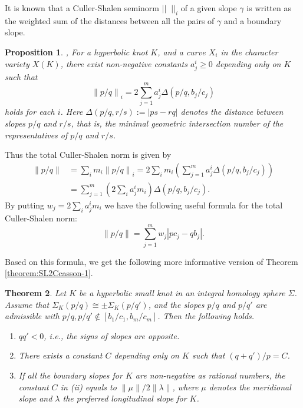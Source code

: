 \documentclass{amsart}
\newtheorem{theorem}{Theorem}[section]
\newtheorem{proposition}[theorem]{Proposition}
\theoremstyle{remark}
\theoremstyle{definition}
\begin{document}
It is known that a Culler-Shalen seminorm $||\;\; ||_{i}$ of a given slope $\gamma$ is written as the weighted sum 
of the distances between all the pairs of $\gamma$ and a boundary slope. 

\begin{proposition}\cite[Lemma 6.2]{BoyerZhang}, \cite[Lemma 2.2.3]{Mattman}
For a hyperbolic knot $K$, and a curve $X_i$ in the character variety $X (K)$,
there exist non-negative constants $a^i_j \ge 0$ depending only on $K$ such that 
$$ \left\|  p/q \right\|_i = 2 \sum_{j=1}^{m} a^i_j \Delta \left( p/q , b_j/c_j \right) $$
holds for each $i$. 
Here $\Delta (p/q,r/s):=|ps-rq|$ denotes the distance between slopes $p/q$ and $r/s$, that is, the minimal geometric intersection number of the representatives of $p/q$ and $r/s$. 
\end{proposition}

Thus the total Culler-Shalen norm is given by
\begin{align*}
\left\| p/q \right\|&=  \sum_{i} m_{i}\left\| p/q \right\|_{i} = 2 \sum_{i} m_{i} \left(\sum_{j=1}^{m} a^i_j \Delta \left(p/q , b_j / c_j \right)  \right)\\
&=\sum_{j=1}^{m}\left(2\sum_{i}a^{i}_{j}m_{i}\right)\Delta\left(p/q , b_j / c_j \right).
\end{align*}
By putting $w_{j}=2\sum_{i}a^{i}_{j}m_{i}$ we have the following useful formula for the total Culler-Shalen norm: 
\begin{equation}
\label{eqn:total-Culler-Shalen-norm}
\left\| p /q  \right\| = \sum_{j=1}^{m} w_{j}|pc_{j}-qb_{j}|. 
\end{equation}



Based on this formula, we get the following more informative version of Theorem \ref{theorem:SL2Ccasson-1}.





\begin{theorem}\label{theorem:boundaryslopeI}
Let $K$ be a hyperbolic small knot in an integral homology sphere $\Sigma$. 
Assume that $\Sigma_K (p/q) \cong \pm \Sigma_K (p/q')$, and the slopes $p/q$ and $p/q'$ are admissible with $p/q, p/q' \not\in [ b_1 / c_1 , b_m / c_m ]$. 
Then the following holds. 
\begin{enumerate}
\item[(i)] $qq'<0$, i.e., the signs of slopes are opposite.
\item[(ii)] There exists a constant $C$ depending only on $K$ such that $(q+q')/p =C$.
\item[(iii)] If all the boundary slopes for $K$ are non-negative as rational numbers, 
the constant $C$ in (ii) equals to $ \| \mu \| / 2 \| \lambda \|$, 
where $\mu$ denotes the meridional slope and  $\lambda$ the preferred longitudinal slope for $K$. 
\end{enumerate}
\end{theorem}
\end{document}
